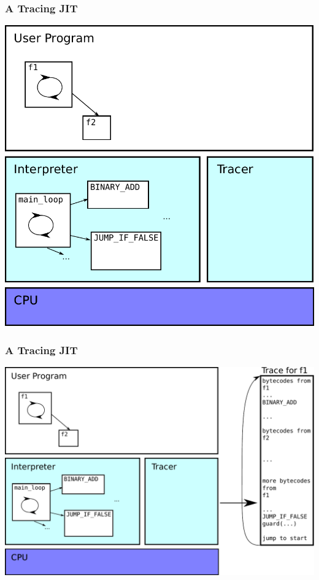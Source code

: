 \documentclass[utf8x]{beamer}
\begin{document}
\begin{frame}
  \frametitle{A Tracing JIT}
  \includegraphics[scale=0.5]{figures/trace02.pdf}
\end{frame}

\begin{frame}
  \frametitle{A Tracing JIT}
  \includegraphics[scale=0.5]{figures/trace03.pdf}
\end{frame}
\end{document}
